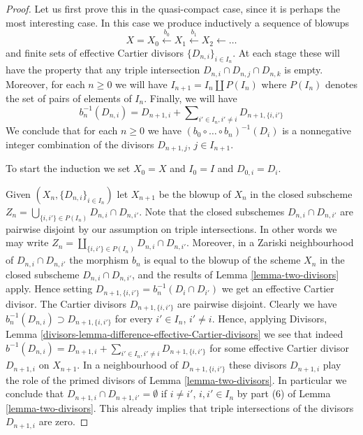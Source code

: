 \begin{proof}
Let us first prove this in the quasi-compact case, since it is perhaps
the most interesting case. In this case we produce inductively a sequence
of blowups
$$
X = X_0 \xleftarrow{b_0} X_1 \xleftarrow{b_1} X_2 \leftarrow \ldots
$$
and finite sets of effective Cartier divisors $\{D_{n, i}\}_{i \in I_n}$.
At each stage these will have the property that any triple
intersection $D_{n, i} \cap D_{n, j} \cap D_{n, k}$ is empty.
Moreover, for each $n \geq 0$ we will have
$I_{n + 1} = I_n \amalg P(I_n)$ where $P(I_n)$ denotes
the set of pairs of elements of $I_n$. Finally, we will have
$$
b_n^{-1}(D_{n, i}) = D_{n + 1, i} +
\sum\nolimits_{i' \in I_n, i' \not = i} D_{n + 1, \{i, i'\}}
$$
We conclude that for each $n \geq 0$ we have
$(b_0 \circ \ldots \circ b_n)^{-1}(D_i)$ is a nonnegative
integer combination of the divisors $D_{n + 1, j}$, $j \in I_{n + 1}$.

\medskip\noindent
To start the induction we set $X_0 = X$ and
$I_0 = I$ and $D_{0, i} = D_i$.

\medskip\noindent
Given $(X_n, \{D_{n, i}\}_{i \in I_n})$ let $X_{n + 1}$ be the
blowup of $X_n$ in the closed subscheme
$Z_n = \bigcup_{\{i, i'\} \in P(I_n)} D_{n, i} \cap D_{n, i'}$.
Note that the closed subschemes $D_{n, i} \cap D_{n, i'}$ are pairwise
disjoint by our assumption on triple intersections.
In other words we may write
$Z_n = \coprod_{\{i, i'\} \in P(I_n)} D_{n, i} \cap D_{n, i'}$.
Moreover, in a Zariski neighbourhood of $D_{n, i} \cap D_{n, i'}$ the
morphism $b_n$ is equal to the blowup of the scheme $X_n$
in the closed subscheme $D_{n, i} \cap D_{n, i'}$, and the results
of Lemma \ref{lemma-two-divisors} apply.
Hence setting $D_{n + 1, \{i, i'\}} = b_n^{-1}(D_i \cap D_{i'})$
we get an effective Cartier divisor.
The Cartier divisors $D_{n + 1, \{i, i'\}}$ are pairwise disjoint.
Clearly we have
$b_n^{-1}(D_{n, i}) \supset D_{n + 1, \{i, i'\}}$ for
every $i' \in I_n$, $i' \not = i$. Hence, applying
Divisors, Lemma \ref{divisors-lemma-difference-effective-Cartier-divisors}
we see that indeed $b^{-1}(D_{n, i}) = D_{n + 1, i} +
\sum\nolimits_{i' \in I_n, i' \not = i} D_{n + 1, \{i, i'\}}$
for some effective Cartier divisor $D_{n + 1, i}$ on $X_{n + 1}$.
In a neighbourhood of $D_{n + 1, \{i, i'\}}$ these divisors
$D_{n + 1, i}$ play the role of the primed divisors of
Lemma \ref{lemma-two-divisors}. In particular we conclude that
$D_{n + 1, i} \cap D_{n + 1, i'} = \emptyset$ if $i \not = i'$,
$i, i' \in I_n$ by part (6) of Lemma \ref{lemma-two-divisors}.
This already implies that triple intersections
of the divisors $D_{n + 1, i}$ are zero.


\end{proof}

